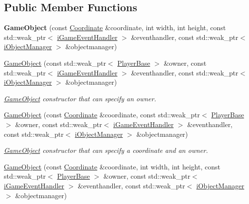 \subsection*{Public Member Functions}
\begin{DoxyCompactItemize}
\item 
\hypertarget{class_course_1_1_game_object_a99d67fed6fa1266f50d43df01d8d3bb1}{{\bfseries Game\-Object} (const \hyperlink{class_course_1_1_coordinate}{Coordinate} \&coordinate, int width, int height, const std\-::weak\-\_\-ptr$<$ \hyperlink{class_course_1_1i_game_event_handler}{i\-Game\-Event\-Handler} $>$ \&eventhandler, const std\-::weak\-\_\-ptr$<$ \hyperlink{class_course_1_1i_object_manager}{i\-Object\-Manager} $>$ \&objectmanager)}\label{class_course_1_1_game_object_a99d67fed6fa1266f50d43df01d8d3bb1}

\item 
\hyperlink{class_course_1_1_game_object_a8a993f2882cca86e6ba555ff75e7fea4}{Game\-Object} (const std\-::weak\-\_\-ptr$<$ \hyperlink{class_course_1_1_player_base}{Player\-Base} $>$ \&owner, const std\-::weak\-\_\-ptr$<$ \hyperlink{class_course_1_1i_game_event_handler}{i\-Game\-Event\-Handler} $>$ \&eventhandler, const std\-::weak\-\_\-ptr$<$ \hyperlink{class_course_1_1i_object_manager}{i\-Object\-Manager} $>$ \&objectmanager)
\begin{DoxyCompactList}\small\item\em \hyperlink{class_course_1_1_game_object}{Game\-Object} constructor that can specify an owner. \end{DoxyCompactList}\item 
\hyperlink{class_course_1_1_game_object_a2517a49905d19c0fc9a79005a34a7db2}{Game\-Object} (const \hyperlink{class_course_1_1_coordinate}{Coordinate} \&coordinate, const std\-::weak\-\_\-ptr$<$ \hyperlink{class_course_1_1_player_base}{Player\-Base} $>$ \&owner, const std\-::weak\-\_\-ptr$<$ \hyperlink{class_course_1_1i_game_event_handler}{i\-Game\-Event\-Handler} $>$ \&eventhandler, const std\-::weak\-\_\-ptr$<$ \hyperlink{class_course_1_1i_object_manager}{i\-Object\-Manager} $>$ \&objectmanager)
\begin{DoxyCompactList}\small\item\em \hyperlink{class_course_1_1_game_object}{Game\-Object} constructor that can specify a coordinate and an owner. \end{DoxyCompactList}\item 
\hyperlink{class_course_1_1_game_object_a66b0a645e623a7e5f6f494df60d7b516}{Game\-Object} (const \hyperlink{class_course_1_1_coordinate}{Coordinate} \&coordinate, int width, int height, const std\-::weak\-\_\-ptr$<$ \hyperlink{class_course_1_1_player_base}{Player\-Base} $>$ \&owner, const std\-::weak\-\_\-ptr$<$ \hyperlink{class_course_1_1i_game_event_handler}{i\-Game\-Event\-Handler} $>$ \&eventhandler, const std\-::weak\-\_\-ptr$<$ \hyperlink{class_course_1_1i_object_manager}{i\-Object\-Manager} $>$ \&objectmanager)

\end{DoxyCompactItemize}

